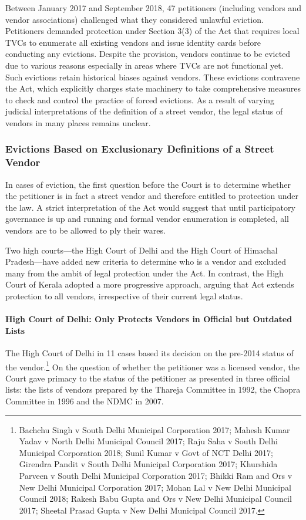 \documentclass[a4paper, 12pt, twoside]{article}
\begin{document}
{Between January 2017 and September 2018, 47 petitioners (including vendors and vendor associations) challenged what they considered unlawful eviction. Petitioners demanded protection under Section 3(3) of the Act that requires local TVCs to enumerate all existing vendors and issue identity cards before conducting any evictions. Despite the provision, vendors continue to be evicted due to various reasons especially in areas where TVCs are not functional yet. Such evictions retain historical biases against vendors. These evictions contravene the Act, which explicitly charges state machinery to take comprehensive measures to check and control the practice of forced evictions. As a result of varying judicial interpretations of the definition of a street vendor, the legal status of vendors in many places remains unclear.

\subsubsection*{Evictions Based on Exclusionary Definitions of a Street Vendor}

In cases of eviction, the first question before the Court is to determine whether the petitioner is in fact a street vendor and therefore entitled to protection under the law. A strict interpretation of the Act would suggest that until participatory governance is up and running and formal vendor enumeration is completed, all vendors are to be allowed to ply their wares. 

Two high courts—the High Court of Delhi and the High Court of Himachal Pradesh—have added new criteria to determine who is a vendor and excluded many from the ambit of legal protection under the Act. In contrast, the High Court of Kerala adopted a more progressive approach, arguing that Act extends protection to all vendors, irrespective of their current legal status.

\paragraph*{High Court of Delhi: Only Protects Vendors in Official but Outdated Lists}

The High Court of Delhi in 11 cases based its decision on the pre-2014 status of the vendor.\footnote{ Bachchu Singh v South Delhi Municipal Corporation 2017; Mahesh Kumar Yadav v North Delhi Municipal Council 2017; Raju Saha v South Delhi Municipal Corporation 2018; Sunil Kumar v Govt of NCT Delhi 2017; Girendra Pandit v South Delhi Municipal Corporation 2017; Khurshida Parveen v South Delhi Municipal Corporation 2017; Bhikki Ram and Ors v New Delhi Municipal Corporation 2017; Mohan Lal v New Delhi Municipal Council 2018; Rakesh Babu Gupta and Ors v New Delhi Municipal Council 2017; Sheetal Prasad Gupta v New Delhi Municipal Council 2017.} On the question of whether the petitioner was a licensed vendor, the Court gave primacy to the status of the petitioner as presented in three official lists: the lists of vendors prepared by the Thareja Committee in 1992, the Chopra Committee in 1996 and the NDMC in 2007. 

}
\end{document}
